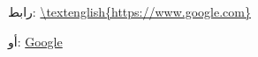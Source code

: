 \documentclass[11pt]{article}
\newcommand{\en}{\textenglish}
\begin{document}
رابط:
\en{\url{\en{https://www.google.com}}}

أو:
\en{\href{https://www.google.com}{Google}}
\end{document}
